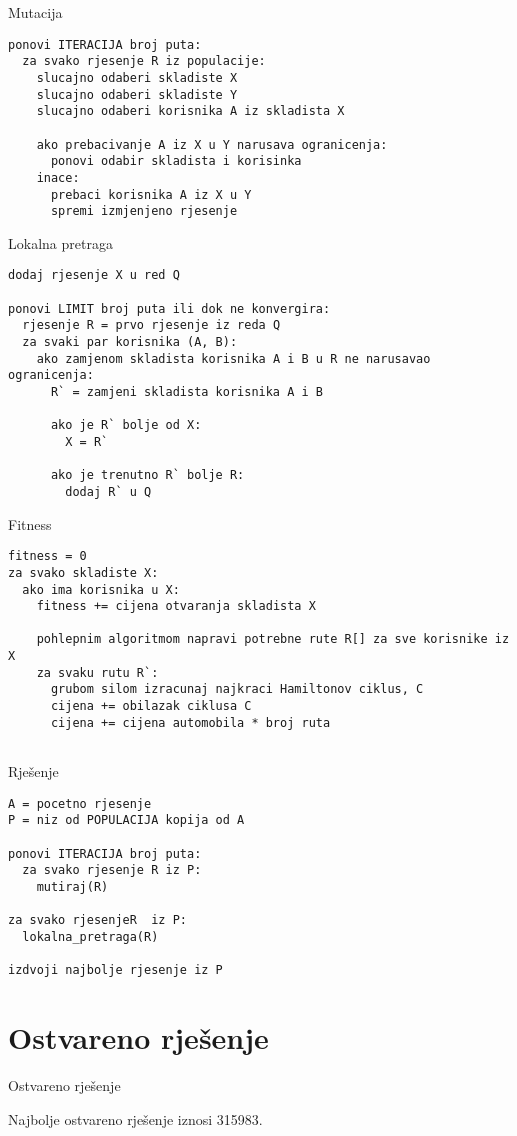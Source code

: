 \documentclass[utf8]{beamer}
\begin{document}
\begin{frame}[fragile]{Mutacija}
\begin{lstlisting}
ponovi ITERACIJA broj puta:
  za svako rjesenje R iz populacije:
    slucajno odaberi skladiste X
    slucajno odaberi skladiste Y
    slucajno odaberi korisnika A iz skladista X
		
    ako prebacivanje A iz X u Y narusava ogranicenja:
      ponovi odabir skladista i korisinka
    inace:
      prebaci korisnika A iz X u Y
      spremi izmjenjeno rjesenje
\end{lstlisting}
\end{frame}

\begin{frame}[fragile]{Lokalna pretraga}
\begin{lstlisting}
dodaj rjesenje X u red Q

ponovi LIMIT broj puta ili dok ne konvergira:
  rjesenje R = prvo rjesenje iz reda Q
  za svaki par korisnika (A, B):
    ako zamjenom skladista korisnika A i B u R ne narusavao ogranicenja:
      R` = zamjeni skladista korisnika A i B
      
      ako je R` bolje od X:
        X = R`
      
      ako je trenutno R` bolje R:
        dodaj R` u Q
\end{lstlisting}
\end{frame}

\begin{frame}[fragile]{Fitness}
\begin{lstlisting}
fitness = 0
za svako skladiste X:
  ako ima korisnika u X:
    fitness += cijena otvaranja skladista X
    
    pohlepnim algoritmom napravi potrebne rute R[] za sve korisnike iz X
    za svaku rutu R`:
      grubom silom izracunaj najkraci Hamiltonov ciklus, C
      cijena += obilazak ciklusa C
      cijena += cijena automobila * broj ruta
      
\end{lstlisting}
\end{frame}

\begin{frame}[fragile]{Rješenje}
\begin{lstlisting}
A = pocetno rjesenje
P = niz od POPULACIJA kopija od A

ponovi ITERACIJA broj puta:
  za svako rjesenje R iz P:
    mutiraj(R)

za svako rjesenjeR  iz P:
  lokalna_pretraga(R)
	
izdvoji najbolje rjesenje iz P
\end{lstlisting}
\end{frame}

\section{Ostvareno rješenje}
\begin{frame}{Ostvareno rješenje}

Najbolje ostvareno rješenje iznosi 315983.

\end{frame}
\end{document}

